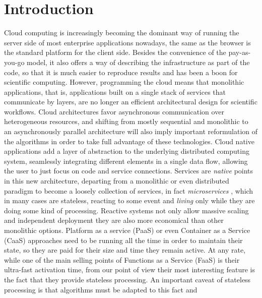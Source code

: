 \documentclass{llncs}
\begin{document}
\section{Introduction}
Cloud computing is increasingly becoming the dominant way of running
the server side of most enterprise applications nowadays, the same as the browser is
the standard platform for the client side. Besides the convenience of the pay-as-you-go
model, it also offers a way of describing the infrastructure as part
of the code, so that it is much easier to reproduce results and has 
been a boon for scientific computing.
However,
programming the cloud means that monolithic applications, that is,
applications built on a single stack of services that communicate by
layers, are no longer an efficient architectural design for scientific workflows. Cloud
architectures favor asynchronous communication over heterogeneous %
resources, and shifting from mostly sequential and monolithic 
to an asynchronously parallel architecture will also imply important
reformulation of the algorithms in order to take full advantage of these technologies.
  Cloud native applications add a layer of abstraction to the
  underlying distributed computing system, seamlessly integrating
  different elements in a single data flow, allowing the user to just focus on code and service connections. Services are {\em native} points
  in this new architecture, departing from a monolithic or even
  distributed paradigm to become a loosely collection of
services, in fact {\em microservices} \cite{microservices}, which in
 many cases are stateless, reacting to some event and
  {\em living} only while they are doing some kind of processing.
  Reactive systems not only allow massive scaling and independent deployment they are also more economical than other monolithic options.  Platform as a service (PaaS) or even Container as a Service (CaaS) approaches need to be running all
  the time in order to maintain their state, so they are paid for their size and
  time they remain active.
  At any rate, while one of the main selling points of Functions as a Service (FaaS) is their ultra-fast activation time, from our point of view their most interesting feature is the fact that they provide stateless processing. An important caveat
  of stateless processing is that algorithms must be adapted to this fact and
\end{document}
